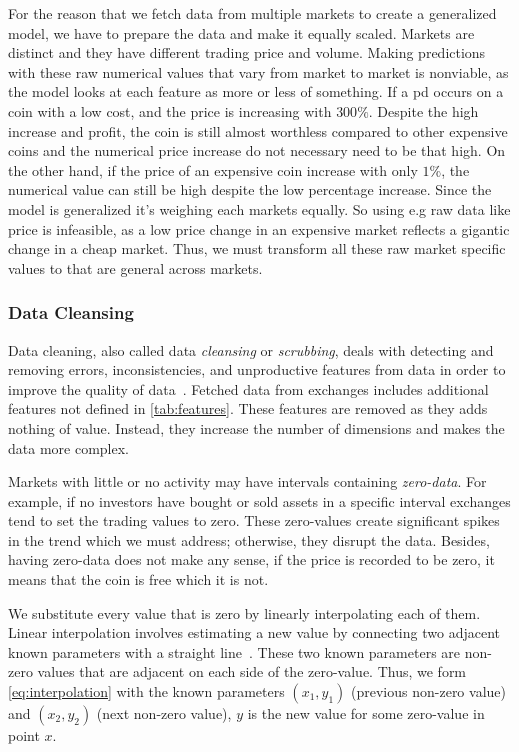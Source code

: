 For the reason that we fetch data from multiple markets to create a generalized model, we have to prepare the data and make it equally scaled. Markets are distinct and they have different trading price and volume. Making predictions with these raw numerical values that vary from market to market is nonviable, as the model looks at each feature as more or less of something. If a \ac{pd} occurs on a coin with a low cost, and the price is increasing with $300\%$. Despite the high increase and profit, the coin is still almost worthless compared to other expensive coins and the numerical price increase do not necessary need to be that high. On the other hand, if the price of an expensive coin increase with only $1\%$, the numerical value can still be high despite the low percentage increase. Since the model is generalized it's weighing each markets equally. So using e.g raw data like price is infeasible, as a low price change in an expensive market reflects a gigantic change in a cheap market. Thus, we must transform all these raw market specific values to that are general across markets.

\subsubsection{Data Cleansing}
Data cleaning, also called data \emph{cleansing} or \emph{scrubbing}, deals with detecting and removing errors, inconsistencies, and unproductive features from data in order to improve the quality of data~\cite{data_cleaning}. Fetched data from exchanges includes additional features not defined in \autoref{tab:features}. These features are removed as they adds nothing of value. Instead, they increase the number of dimensions and makes the data more complex.

Markets with little or no activity may have intervals containing \emph{zero-data}. For example, if no investors have bought or sold assets in a specific interval exchanges tend to set the trading values to zero. These zero-values create significant spikes in the trend which we must address; otherwise, they disrupt the data. Besides, having zero-data does not make any sense, if the price is recorded to be zero, it means that the coin is free which it is not.

We substitute every value that is zero by linearly interpolating each of them. Linear interpolation involves estimating a new value by connecting two adjacent known parameters with a straight line~\cite{interpolate}. These two known parameters are non-zero values that are adjacent on each side of the zero-value. Thus, we form \autoref{eq:interpolation} with the known parameters $(x_1, y_1)$ (previous non-zero value) and $(x_2, y_2)$ (next non-zero value), $y$ is the new value for some zero-value in point $x$.


